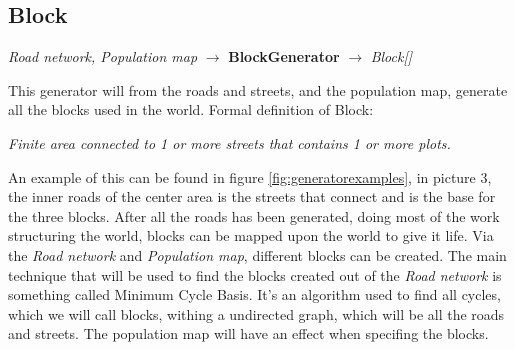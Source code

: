 \subsection{Block}
\begin{center}
    \textit{Road network, Population map} $\rightarrow$ \textbf{BlockGenerator} $\rightarrow$ \textit{Block{[}{]}}
\end{center}
This generator will from the roads and streets, and the population map, generate all the blocks used in the world.
Formal definition of Block:
\begin{center}
    \textit{Finite area connected to 1 or more streets that contains 1 or more plots.}
\end{center}
An example of this can be found in figure \ref{fig:generatorexamples}, in picture 3, the inner roads of the center area is the streets that connect and is the base for the three blocks.
After all the roads has been generated, doing most of the work structuring the world, blocks can be mapped upon the world to give it life.
Via the \textit{Road network} and \textit{Population map}, different blocks can be created. 
The main technique that will be used to find the blocks created out of the \textit{Road network} is something called Minimum Cycle Basis.
It's an algorithm used to find all cycles, which we will call blocks, withing a undirected graph, which will be all the roads and streets. 
The population map will have an effect when specifing the blocks. 